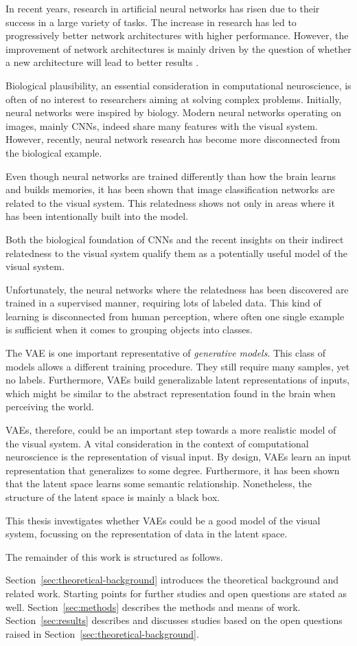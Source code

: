 In recent years, research in artificial neural networks has risen due to their success in a large variety of tasks.
The increase in research has led to progressively better network architectures with higher performance.
However, the improvement of network architectures is mainly driven by the question of whether a new architecture will lead to better results \citep{lindsay2020convolutional}.

Biological plausibility, an essential consideration in computational neuroscience, is often of no interest to researchers aiming at solving complex problems.
Initially, neural networks were inspired by biology.
Modern neural networks operating on images, mainly \acp{CNN}, indeed share many features with the visual system.
However, recently, neural network research has become more disconnected from the biological example.

Even though neural networks are trained differently than how the brain learns and builds memories, it has been shown that image classification networks are related to the visual system.
This relatedness shows not only in areas where it has been intentionally built into the model.

Both the biological foundation of \acp{CNN} and the recent insights on their indirect relatedness to the visual system qualify them as a potentially useful model of the visual system.

Unfortunately, the neural networks where the relatedness has been discovered are trained in a supervised manner, requiring lots of labeled data.
This kind of learning is disconnected from human perception, where often one single example is sufficient when it comes to grouping objects into classes.

The \ac{VAE} is one important representative of \textit{generative models}.
This class of models allows a different training procedure.
They still require many samples, yet no labels.
Furthermore, \acp{VAE} build generalizable latent representations of inputs, which might be similar to the abstract representation found in the brain when perceiving the world.

\acp{VAE}, therefore, could be an important step towards a more realistic model of the visual system.
A vital consideration in the context of computational neuroscience is the representation of visual input.
By design, \acp{VAE} learn an input representation that generalizes to some degree.
Furthermore, it has been shown that the latent space learns some semantic relationship.
Nonetheless, the structure of the latent space is mainly a black box.

This thesis investigates whether \acp{VAE} could be a good model of the visual system, focussing on the representation of data in the latent space.

The remainder of this work is structured as follows.

Section~\ref{sec:theoretical-background} introduces the theoretical background and related work.
Starting points for further studies and open questions are stated as well.
Section~\ref{sec:methods} describes the methods and means of work.
Section~\ref{sec:results} describes and discusses studies based on the open questions raised in Section~\ref{sec:theoretical-background}.
